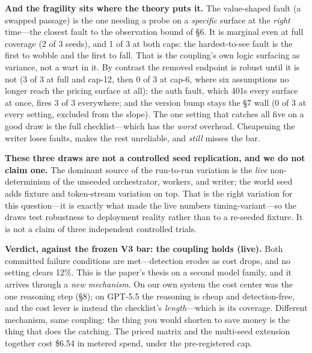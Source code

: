 \documentclass[acmsmall,screen]{acmart}
\begin{document}
\textbf{And the fragility sits where the theory puts it.} The value-shaped fault
(a swapped passage) is the one needing a probe on a \emph{specific} surface at the
\emph{right} time---the closest fault to the observation bound of \S6. It is
marginal even at full coverage (2 of 3 seeds), and 1 of 3 at both caps: the
hardest-to-see fault is the first to wobble and the first to fall. That is the
coupling's own logic surfacing as variance, not a wart in it. By contrast the
removed endpoint is robust until it is not (3 of 3 at full and cap-12, then 0 of 3
at cap-6, where six assumptions no longer reach the pricing surface at all); the
auth fault, which 401s every surface at once, fires 3 of 3 everywhere; and the
version bump stays the \S7 wall (0 of 3 at every setting, excluded from the
slope). The one setting that catches all five on a good draw is the full
checklist---which has the \emph{worst} overhead. Cheapening the writer loses
faults, makes the rest unreliable, and \emph{still} misses the bar.

\textbf{These three draws are not a controlled seed replication, and we do not
claim one.} The dominant source of the run-to-run variation is the \emph{live}
non-determinism of the unseeded orchestrator, workers, and writer; the world seed
adds fixture and token-stream variation on top. That is the right variation for
this question---it is exactly what made the live numbers timing-variant---so the
draws test robustness to deployment reality rather than to a re-seeded fixture. It
is not a claim of three independent controlled trials.

\textbf{Verdict, against the frozen V3 bar: the coupling holds (live).} Both
committed failure conditions are met---detection erodes as cost drops, and no
setting clears 12\%. This is the paper's thesis on a second model family, and it
arrives through a \emph{new mechanism}. On our own system the cost center was the
one reasoning step (\S8); on GPT-5.5 the reasoning is cheap and detection-free,
and the cost lever is instead the checklist's \emph{length}---which is its
coverage. Different mechanism, same coupling: the thing you would shorten to save
money is the thing that does the catching. The priced matrix and the multi-seed
extension together cost \$6.54 in metered spend, under the pre-registered cap.
\end{document}
